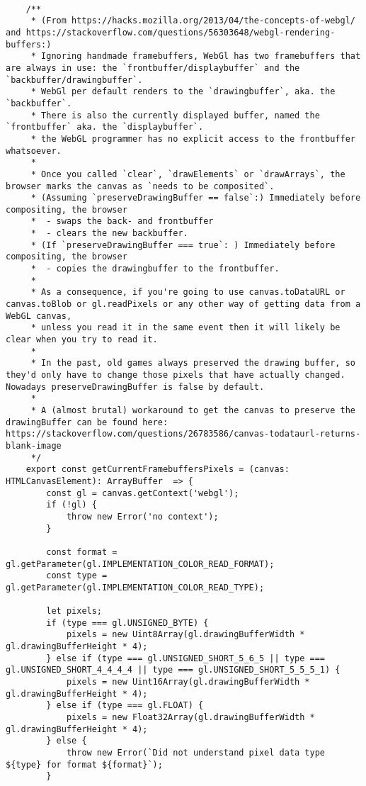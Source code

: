 {\begin{lstlisting}
    
    /**
     * (From https://hacks.mozilla.org/2013/04/the-concepts-of-webgl/ and https://stackoverflow.com/questions/56303648/webgl-rendering-buffers:)
     * Ignoring handmade framebuffers, WebGl has two framebuffers that are always in use: the `frontbuffer/displaybuffer` and the `backbuffer/drawingbuffer`.
     * WebGl per default renders to the `drawingbuffer`, aka. the `backbuffer`.
     * There is also the currently displayed buffer, named the `frontbuffer` aka. the `displaybuffer`.
     * the WebGL programmer has no explicit access to the frontbuffer whatsoever.
     *
     * Once you called `clear`, `drawElements` or `drawArrays`, the browser marks the canvas as `needs to be composited`.
     * (Assuming `preserveDrawingBuffer == false`:) Immediately before compositing, the browser
     *  - swaps the back- and frontbuffer
     *  - clears the new backbuffer.
     * (If `preserveDrawingBuffer === true`: ) Immediately before compositing, the browser
     *  - copies the drawingbuffer to the frontbuffer.
     *
     * As a consequence, if you're going to use canvas.toDataURL or canvas.toBlob or gl.readPixels or any other way of getting data from a WebGL canvas,
     * unless you read it in the same event then it will likely be clear when you try to read it.
     *
     * In the past, old games always preserved the drawing buffer, so they'd only have to change those pixels that have actually changed. Nowadays preserveDrawingBuffer is false by default.
     *
     * A (almost brutal) workaround to get the canvas to preserve the drawingBuffer can be found here: https://stackoverflow.com/questions/26783586/canvas-todataurl-returns-blank-image
     */
    export const getCurrentFramebuffersPixels = (canvas: HTMLCanvasElement): ArrayBuffer  => {
        const gl = canvas.getContext('webgl');
        if (!gl) {
            throw new Error('no context');
        }
    
        const format = gl.getParameter(gl.IMPLEMENTATION_COLOR_READ_FORMAT);
        const type = gl.getParameter(gl.IMPLEMENTATION_COLOR_READ_TYPE);
    
        let pixels;
        if (type === gl.UNSIGNED_BYTE) {
            pixels = new Uint8Array(gl.drawingBufferWidth * gl.drawingBufferHeight * 4);
        } else if (type === gl.UNSIGNED_SHORT_5_6_5 || type === gl.UNSIGNED_SHORT_4_4_4_4 || type === gl.UNSIGNED_SHORT_5_5_5_1) {
            pixels = new Uint16Array(gl.drawingBufferWidth * gl.drawingBufferHeight * 4);
        } else if (type === gl.FLOAT) {
            pixels = new Float32Array(gl.drawingBufferWidth * gl.drawingBufferHeight * 4);
        } else {
            throw new Error(`Did not understand pixel data type ${type} for format ${format}`);
        }
    

\end{lstlisting}}
